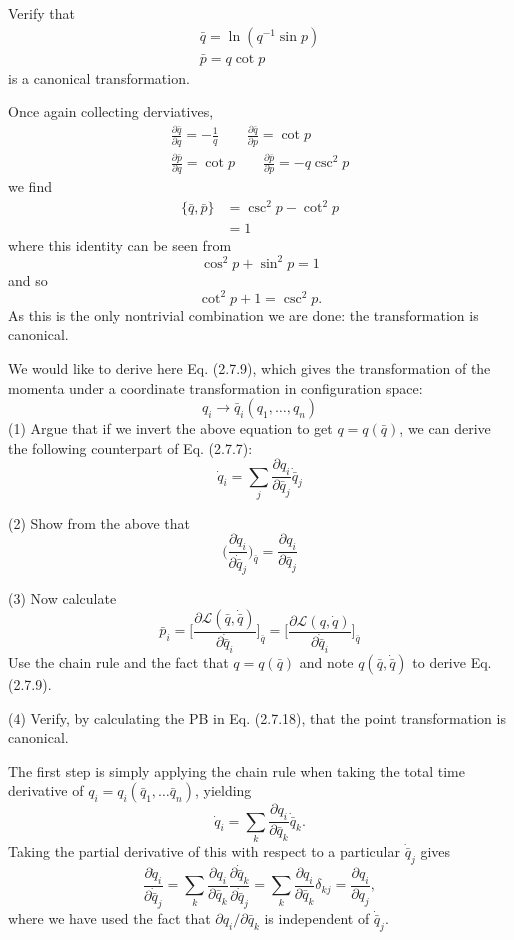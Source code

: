 \documentclass[../principles-of-quantum-mechanics.tex]{subfiles}
\begin{document}
\begin{questions}
		\question Verify that
		\begin{gather*}
			\bar{q} = \ln(q^{-1}\sin p) \\
			\bar{p} = q\cot p
		\end{gather*}
		is a canonical transformation.
		
		\begin{solution}
			Once again collecting derviatives,
			\begin{gather*}
				\frac{\partial \bar{q}}{\partial q} = -\frac{1}{q} \qquad \frac{\partial \bar{q}}{\partial p} = \cot p \\
				\frac{\partial \bar{p}}{\partial q} = \cot{p} \qquad \frac{\partial \bar{p}}{\partial p} = -q\csc^2p
			\end{gather*}
			we find
			\begin{align*}
				\{\bar{q}, \bar{p}\} &= \csc^2p - \cot^2 p \\
				&= 1
			\end{align*}
			where this identity can be seen from
			\[
				\cos^2p + \sin^2p = 1
			\]
			and so
			\[
				\cot^2p + 1 = \csc^2p.
			\]
			As this is the only nontrivial combination we are done: the transformation is canonical.
		\end{solution}
		
		\question We would like to derive here Eq. (2.7.9), which gives the transformation of the momenta under a coordinate transformation in configuration space:
		\[
			q_i \to \bar{q}_i(q_1, \dots, q_n)
		\]
		(1) Argue that if we invert the above equation to get $q = q(\bar{q})$, we can derive the following counterpart of Eq. (2.7.7):
		\[
			\dot{q}_i = \sum_j\frac{\partial q_i}{\partial \bar{q}_j}\dot{\bar{q}}_j
		\]
		
		(2) Show from the above that
		\[
			\Big(\frac{\partial\dot{q}_i}{\partial\dot{\bar{q}}_j}\Big)_{\bar{q}} = \frac{\partial q_i}{\partial\bar{q}_j}
		\]
		
		(3) Now calculate
		\[
			\bar{p}_i = \Big[\frac{\partial\mathcal{L}(\bar{q}, \dot{\bar{q}})}{\partial\dot{\bar{q}}_i}\Big]_{\bar{q}} = \Big[\frac{\partial\mathcal{L}({q}, \dot{{q}})}{\partial\dot{\bar{q}}_i}\Big]_{\bar{q}}
		\]
		Use the chain rule and the fact that $q = q(\bar{q})$ and note $q(\bar{q}, \dot{\bar{q}})$ to derive Eq. (2.7.9).
		
		(4) Verify, by calculating the PB in Eq. (2.7.18), that the point transformation is canonical.
		
		\begin{solution}
			The first step is simply applying the chain rule when taking the total time derivative of $q_i = q_i(\bar{q}_1,\dots\bar{q}_n)$, yielding
			\[
				\dot{q}_i = \sum_k\frac{\partial q_i}{\partial \bar{q}_k}\dot{\bar{q}}_k.
			\]
			Taking the partial derivative of this with respect to a particular $\dot{\bar{q}}_j$ gives
			\[
				\frac{\partial\dot{q}_i}{\partial \dot{\bar{q}}_j} = \sum_k\frac{\partial q_i}{\partial \bar{q}_k} \frac{\partial \dot{\bar{q}}_k}{\partial \dot{\bar{q}}_j} = \sum_k\frac{\partial q_i}{\partial \bar{q}_k}\delta_{kj} = \frac{\partial q_i}{\partial q_j},
			\]
			where we have used the fact that $\partial q_i / \partial \bar{q}_k$ is independent of $\dot{\bar{q}}_j$.
			

\end{solution}
\end{questions}
\end{document}
